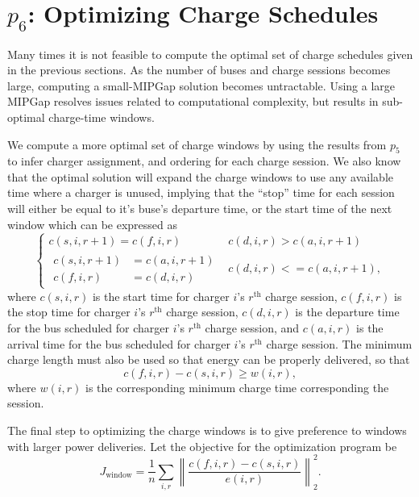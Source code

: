 \section{$p_6$: Optimizing Charge Schedules\label{sec:optimizingChargeSchedules}}
Many times it is not feasible to compute the optimal set of charge schedules given in the previous sections. As the number of buses and charge sessions becomes large, computing a small-MIPGap solution becomes untractable. Using a large MIPGap resolves issues related to computational complexity, but results in sub-optimal charge-time windows.
\par We compute a more optimal set of charge windows by using the results from $p_5$ to infer charger assignment, and ordering for each charge session. We also know that the optimal solution will expand the charge windows to use any available time where a charger is unused, implying that the ``stop'' time for each session will either be equal to it's buse's departure time, or the start time of the next window which can be expressed as
\begin{equation}\label{eqn:optChargeSchedules:eqn1}
\begin{cases}
	c(s,i,r+1) = c(f,i,r) & c(d,i,r) > c(a,i,r+1)\\[0.08in]
	\begin{aligned}
	c(s,i,r+1) &= c(a,i,r+1) \\
	c(f,i,r) &= c(d,i,r)
	\end{aligned} & c(d,i,r) <= c(a,i,r+1), 
\end{cases}
\end{equation}
where $c(s,i,r)$ is the start time for charger $i$'s $r^{\text{th}}$ charge session, $c(f,i,r)$ is the stop time for charger $i$'s $r^{\text{th}}$ charge session, $c(d,i,r)$ is the departure time for the bus scheduled for charger $i$'s $r^{\text{th}}$ charge session, and $c(a,i,r)$ is the arrival time for the bus scheduled for charger $i$'s $r^{\text{th}}$ charge session. 
The minimum charge length must also be used so that energy can be properly delivered, so that
\begin{equation}\label{eqn:optChargeSchedules:eqn2}
	c(f,i,r) - c(s,i,r) \ge w(i,r),
\end{equation}
where $w(i,r)$ is the corresponding minimum charge time corresponding the session.
\par The final step to optimizing the charge windows is to give preference to windows with larger power deliveries. Let the objective for the optimization program be 
\begin{equation}\label{eqn:optChargeSchedule:objective}
	J_{\text{window}} = \frac{1}{n}\sum_{i,r} \left \lVert \frac{c(f,i,r) - c(s,i,r)}{e(i,r)} \right \rVert^2_2.
\end{equation}
